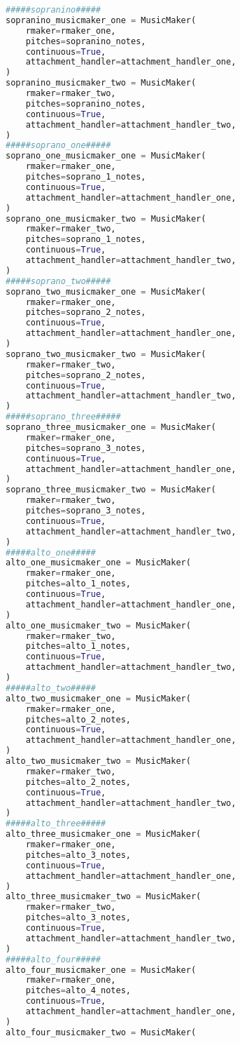 \begin{lstlisting}[language=Python, caption=Invocation Source Code]
#####sopranino#####
sopranino_musicmaker_one = MusicMaker(
    rmaker=rmaker_one,
    pitches=sopranino_notes,
    continuous=True,
    attachment_handler=attachment_handler_one,
)
sopranino_musicmaker_two = MusicMaker(
    rmaker=rmaker_two,
    pitches=sopranino_notes,
    continuous=True,
    attachment_handler=attachment_handler_two,
)
#####soprano_one#####
soprano_one_musicmaker_one = MusicMaker(
    rmaker=rmaker_one,
    pitches=soprano_1_notes,
    continuous=True,
    attachment_handler=attachment_handler_one,
)
soprano_one_musicmaker_two = MusicMaker(
    rmaker=rmaker_two,
    pitches=soprano_1_notes,
    continuous=True,
    attachment_handler=attachment_handler_two,
)
#####soprano_two#####
soprano_two_musicmaker_one = MusicMaker(
    rmaker=rmaker_one,
    pitches=soprano_2_notes,
    continuous=True,
    attachment_handler=attachment_handler_one,
)
soprano_two_musicmaker_two = MusicMaker(
    rmaker=rmaker_two,
    pitches=soprano_2_notes,
    continuous=True,
    attachment_handler=attachment_handler_two,
)
#####soprano_three#####
soprano_three_musicmaker_one = MusicMaker(
    rmaker=rmaker_one,
    pitches=soprano_3_notes,
    continuous=True,
    attachment_handler=attachment_handler_one,
)
soprano_three_musicmaker_two = MusicMaker(
    rmaker=rmaker_two,
    pitches=soprano_3_notes,
    continuous=True,
    attachment_handler=attachment_handler_two,
)
#####alto_one#####
alto_one_musicmaker_one = MusicMaker(
    rmaker=rmaker_one,
    pitches=alto_1_notes,
    continuous=True,
    attachment_handler=attachment_handler_one,
)
alto_one_musicmaker_two = MusicMaker(
    rmaker=rmaker_two,
    pitches=alto_1_notes,
    continuous=True,
    attachment_handler=attachment_handler_two,
)
#####alto_two#####
alto_two_musicmaker_one = MusicMaker(
    rmaker=rmaker_one,
    pitches=alto_2_notes,
    continuous=True,
    attachment_handler=attachment_handler_one,
)
alto_two_musicmaker_two = MusicMaker(
    rmaker=rmaker_two,
    pitches=alto_2_notes,
    continuous=True,
    attachment_handler=attachment_handler_two,
)
#####alto_three#####
alto_three_musicmaker_one = MusicMaker(
    rmaker=rmaker_one,
    pitches=alto_3_notes,
    continuous=True,
    attachment_handler=attachment_handler_one,
)
alto_three_musicmaker_two = MusicMaker(
    rmaker=rmaker_two,
    pitches=alto_3_notes,
    continuous=True,
    attachment_handler=attachment_handler_two,
)
#####alto_four#####
alto_four_musicmaker_one = MusicMaker(
    rmaker=rmaker_one,
    pitches=alto_4_notes,
    continuous=True,
    attachment_handler=attachment_handler_one,
)
alto_four_musicmaker_two = MusicMaker(

\end{lstlisting}
